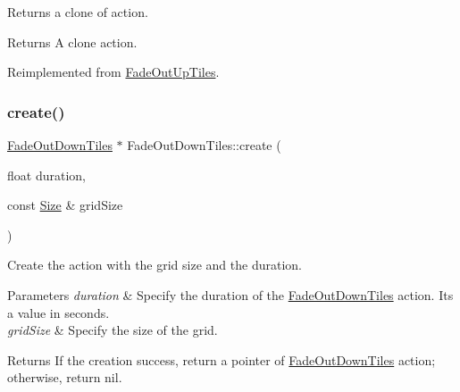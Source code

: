 Returns a clone of action.

\begin{DoxyReturn}{Returns}
A clone action. 
\end{DoxyReturn}


Reimplemented from \hyperlink{classFadeOutUpTiles_aa408cee44da1d5e8ebb41063d58a0de9}{Fade\+Out\+Up\+Tiles}.

\mbox{\label{classFadeOutDownTiles_a7f7b443a477d977fdcc2e02e6072469e}} 
\subsubsection{\texorpdfstring{create()}{create()}\hspace{0.1cm}{\footnotesize\ttfamily [1/2]}}
{\footnotesize\ttfamily \hyperlink{classFadeOutDownTiles}{Fade\+Out\+Down\+Tiles} $\ast$ Fade\+Out\+Down\+Tiles\+::create (\begin{DoxyParamCaption}\item[{float}]{duration,  }\item[{const \hyperlink{classSize}{Size} \&}]{grid\+Size }\end{DoxyParamCaption})\hspace{0.3cm}{\ttfamily [static]}}



Create the action with the grid size and the duration. 


\begin{DoxyParams}{Parameters}
{\em duration} & Specify the duration of the \hyperlink{classFadeOutDownTiles}{Fade\+Out\+Down\+Tiles} action. It\textquotesingle{}s a value in seconds. \\
\hline
{\em grid\+Size} & Specify the size of the grid. \\
\hline
\end{DoxyParams}
\begin{DoxyReturn}{Returns}
If the creation success, return a pointer of \hyperlink{classFadeOutDownTiles}{Fade\+Out\+Down\+Tiles} action; otherwise, return nil. 
\end{DoxyReturn}
\mbox{\label{classFadeOutDownTiles_abe294541edb005596c7a9703e3cf5517}} 
